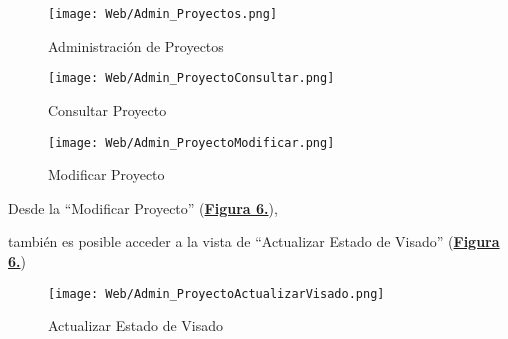 \begin{figure}[!htbp]
  \centering
  \texttt{[image: Web/Admin\_Proyectos.png]}
  \caption{Administración de Proyectos}
  \label{fig:Web_Admin_Proyectos}
\end{figure}
\FloatBarrier

\begin{figure}[!htbp]
  \centering
  \texttt{[image: Web/Admin\_ProyectoConsultar.png]}
  \caption{Consultar Proyecto}
  \label{fig:Web_Admin_ProyectoConsultar}
\end{figure}
\FloatBarrier

\begin{figure}[!htbp]
  \centering
  \texttt{[image: Web/Admin\_ProyectoModificar.png]}
  \caption{Modificar Proyecto}
  \label{fig:Web_Admin_ProyectoModificar}
\end{figure}
\FloatBarrier

Desde la ``Modificar Proyecto'' (\textbf{\hyperref[fig:Web_Admin_ProyectoModificar]{Figura 6.}}),\addtocounter{figura_manual}{1} también es posible acceder a la vista de ``Actualizar Estado de Visado'' (\textbf{\hyperref[fig:Web_Admin_ProyectoActualizarVisado]{Figura 6.}})
\begin{figure}[!htbp]
  \centering
  \texttt{[image: Web/Admin\_ProyectoActualizarVisado.png]}
  \caption{Actualizar Estado de Visado}
  \label{fig:Web_Admin_ProyectoActualizarVisado}
\end{figure}
\FloatBarrier